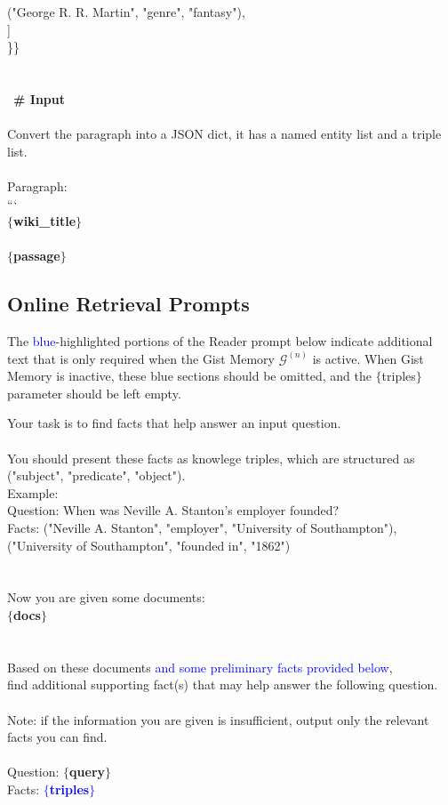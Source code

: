 \begin{prompt}[title={Reader}]
        ("George R. R. Martin", "genre", "fantasy"), \\
    ] \\
\}\} \\
\\
\\
\ \textbf{\# Input} \\
\\
Convert the paragraph into a JSON dict, it has a named entity list and a triple list. \\
\\
Paragraph: \\
``` \\
\textbf{$\{$wiki\_title$\}$} \\
\\
\textbf{$\{$passage$\}$}\\
\end{prompt}

\subsection{Online Retrieval Prompts}
\label{subsec:online_retrieval_prompts}

The \textcolor{blue}{blue}-highlighted portions of the Reader prompt below indicate additional text that is only required when the Gist Memory $\mathcal{G}^{(n)}$ is active. When Gist Memory is inactive, these blue sections should be omitted, and the $\{$triples$\}$ parameter should be left empty.

\begin{prompt}[title={Reader with and without Gist Memory }]
Your task is to find facts that help answer an input question. \\
\\
You should present these facts as knowlege triples, which are structured as ("subject", "predicate", "object"). \\
Example: \\
Question: When was Neville A. Stanton's employer founded? \\
Facts: ("Neville A. Stanton", "employer", "University of Southampton"), ("University of Southampton", "founded in", "1862") \\
\\
\\
Now you are given some documents:\\
\textbf{$\{$docs$\}$} \\
\\
\\
Based on these documents \textcolor{blue}{and some preliminary facts provided below}, \\ find additional supporting fact(s) that may help answer the following question. \\
 \\
Note: if the information you are given is insufficient, output only the relevant facts you can find.\\
\\
Question: \textbf{$\{$query$\}$} \\
Facts: \textcolor{blue}{\textbf{$\{$triples$\}$}} \\
\end{prompt}

